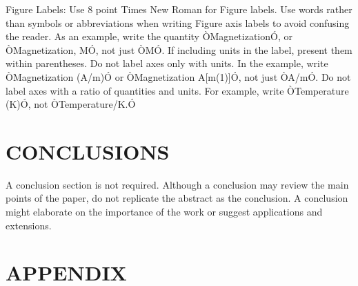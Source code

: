 \documentclass[letterpaper, 10 pt, conference]{ieeeconf}  %
\begin{document}
Figure Labels: Use 8 point Times New Roman for Figure labels. Use words rather than symbols or abbreviations when writing Figure axis labels to avoid confusing the reader. As an example, write the quantity ÒMagnetizationÓ, or ÒMagnetization, MÓ, not just ÒMÓ. If including units in the label, present them within parentheses. Do not label axes only with units. In the example, write ÒMagnetization (A/m)Ó or ÒMagnetization {A[m(1)]}Ó, not just ÒA/mÓ. Do not label axes with a ratio of quantities and units. For example, write ÒTemperature (K)Ó, not ÒTemperature/K.Ó

\section{CONCLUSIONS}

A conclusion section is not required. Although a conclusion may review the main points of the paper, do not replicate the abstract as the conclusion. A conclusion might elaborate on the importance of the work or suggest applications and extensions. 

\addtolength{\textheight}{-12cm}   %







\section*{APPENDIX}
\end{document}
